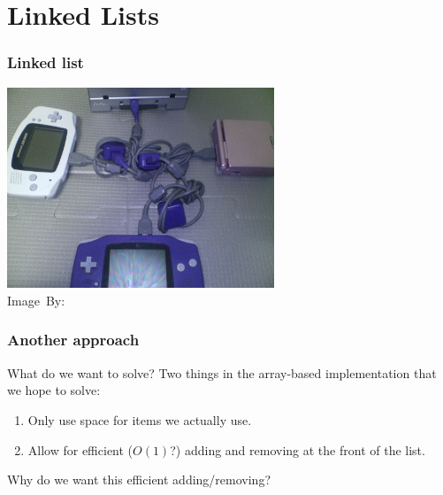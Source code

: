 \section{Linked Lists}
\label{sec:linked_lists}

\begin{frame}
	\frametitle{Linked list}
	\begin{center}
		\includegraphics[width=0.6\textwidth]{figures/gba.jpg}\\
		\hspace*{15pt}\hbox{\scriptsize Image By:}
	\end{center}
\end{frame}

\begin{frame}
	\frametitle{Another approach}
	
	\begin{problemblock}{What do we want to solve?}
		Two things in the array-based implementation that we hope to solve:
		\begin{enumerate}
			\item Only use space for items we actually use.
			\item Allow for efficient ($O(1)$?) adding and removing at the front of the list.
		\end{enumerate}
	\end{problemblock}
	\pause
	\begin{questionblock}{}
		Why do we want this efficient adding/removing?
	\end{questionblock}
\end{frame}

